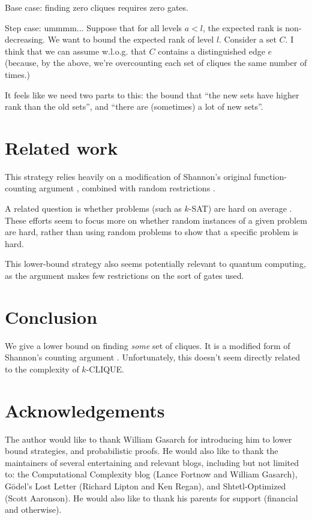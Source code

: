 \documentclass[12pt]{article}
\theoremstyle{definition}
\begin{document}
Base case: finding zero cliques requires zero gates.

Step case: ummmm... Suppose that for all levels $a < l$,
the expected rank is non-decreasing.
We want to bound the expected rank of level $l$.
Consider a set $C$. I think that we can assume w.l.o.g. that
$C$ contains a distinguished edge $e$ (because, by the above,
we're overcounting each set of cliques the same number of times.)


It feels like we need two parts to this: the bound that
``the new sets have higher rank than the old sets'', and
``there are (sometimes) a lot of new sets''.


\section{Related work}

This strategy relies heavily on a modification of Shannon's original
function-counting argument \cite{shannon_synthesis_1949},
combined with random restrictions
\cite{subbotovskaya1963comparison} \cite{hastad1987lower}.

A related question is whether problems
(such as $k$-SAT) are
hard on average \cite{bogdanov2006average}.
These efforts seem to focus more on whether
random
instances of a given problem are hard, rather
than using random problems to show that
a specific problem is hard.

This lower-bound strategy also seems potentially
relevant to quantum computing,
as the argument makes few restrictions on the sort of gates used.

\section{Conclusion}

We give a lower bound on finding {\em some} set of cliques.
It is a modified form of Shannon's counting argument
\cite{shannon_synthesis_1949}. Unfortunately,
this doesn't seem directly related to the
complexity of $k$-CLIQUE.

\section{Acknowledgements}

The author would like to thank William Gasarch for introducing him
to lower bound strategies, and probabilistic proofs.
He would also like to thank the maintainers of
several entertaining and relevant blogs, including but
not limited to: the Computational Complexity blog
(Lance Fortnow and William Gasarch), 
G\"odel's Lost Letter (Richard Lipton and Ken Regan),
and Shtetl-Optimized (Scott Aaronson). 
He would also like to thank
his parents for support (financial and otherwise).
\end{document}
